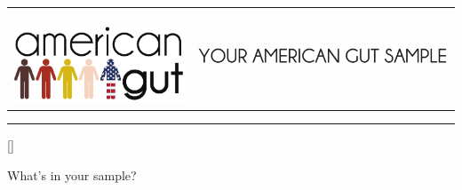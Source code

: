 \documentclass[landscape]{article}
\begin{document}
\begin{tabular}{ m{4.4cm} m{16cm} }  %
	~~\includegraphics[height=0.08\textheight]{pdfs-oralskin/logoshape.pdf} & \includegraphics[height=0.065\textheight]{pdfs-oralskin/youramericangutsampletext.pdf} \\
\end{tabular}

\hrule

\vspace{0.65cm}


\begin{center}

\StrLen{\yourname}[\yournameLen]


\end{center}

\vspace{0.65cm}


{\huge What's in your \sampletype{} sample?}

\vspace{2mm}
\end{document}

